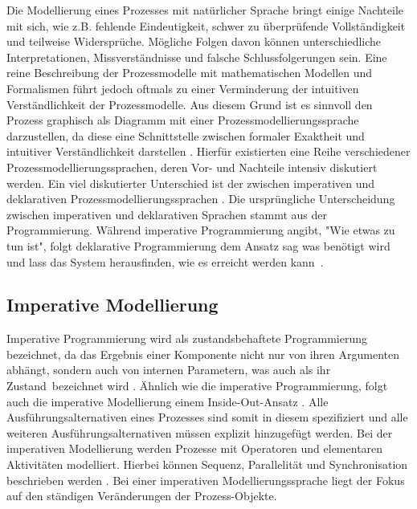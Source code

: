 Die Modellierung eines Prozesses mit natürlicher Sprache bringt einige Nachteile mit sich, wie z.B. fehlende Eindeutigkeit, schwer zu überprüfende Vollständigkeit und teilweise Widersprüche. Mögliche Folgen davon können unterschiedliche Interpretationen, Missverständnisse und falsche Schlussfolgerungen sein. Eine reine Beschreibung der Prozessmodelle mit mathematischen Modellen und Formalismen führt jedoch oftmals zu einer Verminderung der intuitiven Verständlichkeit der Prozessmodelle. Aus diesem Grund ist es sinnvoll den Prozess graphisch als Diagramm mit einer Prozessmodellierungssprache darzustellen, da diese eine Schnittstelle zwischen formaler Exaktheit und intuitiver Verständlichkeit darstellen \cite{thomas2009,kircher2006}.  \newline
Hierfür existierten eine Reihe verschiedener Prozessmodellierungssprachen, deren Vor- und Nachteile intensiv diskutiert werden. Ein viel diskutierter Unterschied ist der zwischen imperativen und deklarativen Prozessmodellierungssprachen \cite{fahland2010}. \newline
Die ursprüngliche Unterscheidung zwischen imperativen und deklarativen Sprachen stammt aus der Programmierung. Während imperative Programmierung angibt, "Wie etwas zu tun ist", folgt deklarative Programmierung dem Ansatz \grqq sag was benötigt wird und lass das System herausfinden, wie es erreicht werden kann\grqq \ \cite{pichler2012}.

\subsection{Imperative Modellierung}
Imperative Programmierung wird als zustandsbehaftete Programmierung bezeichnet, da das  Ergebnis einer Komponente nicht nur von ihren Argumenten abhängt, sondern auch von internen Parametern, was auch als ihr \grqq Zustand\grqq \  bezeichnet wird \cite{fahland2010}.  \newline
Ähnlich wie die imperative Programmierung, folgt auch die imperative Modellierung einem \grqq Inside-Out-Ansatz \grqq. Alle Ausführungsalternativen eines Prozesses sind somit in diesem spezifiziert und alle weiteren Ausführungsalternativen müssen explizit hinzugefügt werden. Bei der imperativen Modellierung werden Prozesse mit Operatoren und elementaren Aktivitäten modelliert. Hierbei können Sequenz, Parallelität und Synchronisation beschrieben werden \cite{kaschek1998}. Bei einer imperativen Modellierungssprache liegt der Fokus auf den ständigen Veränderungen der Prozess-Objekte.


